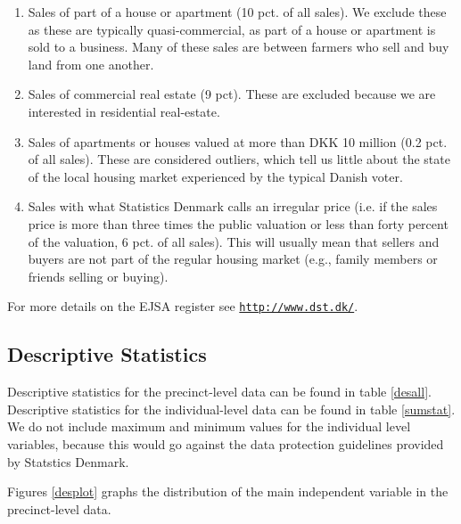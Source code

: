\documentclass[12pt,a4paper]{article}
\begin{document}
	\begin{enumerate}
		\item Sales of part of a house or apartment (10 pct. of all sales). We exclude these as these are typically quasi-commercial, as part of a house or apartment is sold to a business. Many of these sales are between farmers who sell and buy land from one another.
		\item Sales of commercial real estate (9 pct). These are excluded because we are interested in residential real-estate.
		\item Sales of apartments or houses valued at more than DKK 10 million (0.2 pct. of all sales). These are considered outliers, which tell us little about the state of the local housing market experienced by the typical Danish voter.
		\item Sales with what Statistics Denmark calls an irregular price (i.e. if the sales price is more than three times the public valuation or less than forty percent of the valuation, 6 pct. of all sales). This will usually mean that sellers and buyers are not part of the regular housing market (e.g., family members or friends selling or buying).
	\end{enumerate}
	
	For more details on the EJSA register see \texttt{\href{http://www.dst.dk/extranet/ForskningVariabellister/EJSA\%20-\%20Ejendomme\%20salgsoplysninger.html}{http://www.dst.dk/}}.

	\newpage		
			\subsection{Descriptive Statistics} \label{sumstats}
			\setcounter{table}{0}
			
			Descriptive statistics for the precinct-level data can be found in table \ref{desall}. Descriptive statistics for the individual-level data can be found in table \ref{sumstat}. We do not include maximum and minimum values for the individual level variables, because this would go against the data protection guidelines provided by Statstics Denmark.
			
			Figures \ref{desplot} graphs the distribution of the main independent variable in the precinct-level data. 
			
			
			
			
\end{document}
